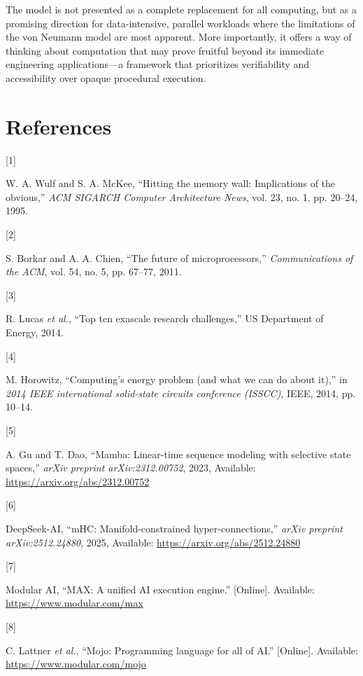 \documentclass[
  a4paper,
  DIV=11,
  numbers=noendperiod]{scrartcl}
\newlength{\cslhangindent}
\newlength{\csllabelwidth}
\newenvironment{CSLReferences}[2] %
 {\begin{list}{}{%
  \setlength{\itemindent}{0pt}
  \setlength{\leftmargin}{0pt}
  \setlength{\parsep}{0pt}
  \ifodd #1
   \setlength{\leftmargin}{\cslhangindent}
   \setlength{\itemindent}{-1\cslhangindent}
  \fi
  \setlength{\itemsep}{#2\baselineskip}}}
 {\end{list}}
\newcommand{\CSLLeftMargin}[1]{\parbox[t]{\csllabelwidth}{\strut#1\strut}}
\newcommand{\CSLRightInline}[1]{\parbox[t]{\linewidth - \csllabelwidth}{\strut#1\strut}}
\begin{document}
The model is not presented as a complete replacement for all computing,
but as a promising direction for data-intensive, parallel workloads
where the limitations of the von Neumann model are most apparent. More
importantly, it offers a way of thinking about computation that may
prove fruitful beyond its immediate engineering applications---a
framework that prioritizes verifiability and accessibility over opaque
procedural execution.

\section*{References}\label{references}

\label{refs}
\begin{CSLReferences}{0}{0}
\CSLLeftMargin{{[}1{]} }%
\CSLRightInline{W. A. Wulf and S. A. McKee, {``Hitting the memory wall:
Implications of the obvious,''} \emph{ACM SIGARCH Computer Architecture
News}, vol. 23, no. 1, pp. 20--24, 1995.}

\CSLLeftMargin{{[}2{]} }%
\CSLRightInline{S. Borkar and A. A. Chien, {``The future of
microprocessors,''} \emph{Communications of the ACM}, vol. 54, no. 5,
pp. 67--77, 2011.}

\CSLLeftMargin{{[}3{]} }%
\CSLRightInline{R. Lucas \emph{et al.}, {``Top ten exascale research
challenges,''} US Department of Energy, 2014.}

\CSLLeftMargin{{[}4{]} }%
\CSLRightInline{M. Horowitz, {``Computing's energy problem (and what we
can do about it),''} in \emph{2014 IEEE international solid-state
circuits conference (ISSCC)}, IEEE, 2014, pp. 10--14.}

\CSLLeftMargin{{[}5{]} }%
\CSLRightInline{A. Gu and T. Dao, {``Mamba: Linear-time sequence
modeling with selective state spaces,''} \emph{arXiv preprint
arXiv:2312.00752}, 2023, Available:
\url{https://arxiv.org/abs/2312.00752}}

\CSLLeftMargin{{[}6{]} }%
\CSLRightInline{DeepSeek-AI, {``mHC: Manifold-constrained
hyper-connections,''} \emph{arXiv preprint arXiv:2512.24880}, 2025,
Available: \url{https://arxiv.org/abs/2512.24880}}

\CSLLeftMargin{{[}7{]} }%
\CSLRightInline{Modular AI, {``MAX: A unified AI execution engine.''}
{[}Online{]}. Available: \url{https://www.modular.com/max}}

\CSLLeftMargin{{[}8{]} }%
\CSLRightInline{C. Lattner \emph{et al.}, {``Mojo: Programming language
for all of AI.''} {[}Online{]}. Available:
\url{https://www.modular.com/mojo}}

\end{CSLReferences}
\end{document}
